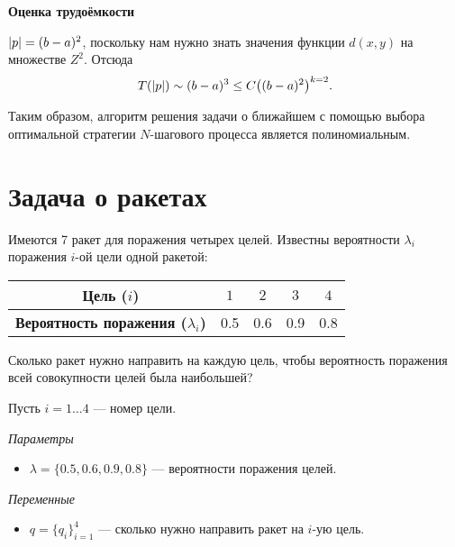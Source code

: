 \bigskip

\textbf{Оценка трудоёмкости}

$\abs{p} = (b - a)^2$, поскольку нам нужно знать значения функции $d(x, y)$ на множестве $Z^2$. Отсюда
\[
T(\abs{p}) \sim (b - a)^3 \le C \big((b-a)^2\big)^{k=2}.
\]

Таким образом, алгоритм решения задачи о ближайшем с помощью выбора оптимальной стратегии $N$-шагового процесса является полиномиальным.

\section{Задача о ракетах}

\problem[о ракетах]

Имеются 7 ракет для поражения четырех целей. Известны вероятности $\lambda_i$ поражения $i$-ой цели одной ракетой: 

\begin{table}[H]
	\centering
	\begin{tabular}{| c | c | c | c | c |} 
		\hline
		\textbf{Цель ($i$)}             & $1$ & $2$ & $3$ & $4$ \\\hline
		\textbf{Вероятность поражения ($\lambda_i$)}              &0.5   & 0.6   & 0.9   & 0.8 \\\hline
	\end{tabular}
\end{table}

Сколько ракет нужно направить на каждую цель, чтобы вероятность поражения всей совокупности целей была наибольшей?

\mathmodel

Пусть $i = 1 \dots 4$ --- номер цели.

\bigskip

\textit{Параметры}

\begin{itemize}[nosep]
	\item $\lambda = \{0.5, 0.6, 0.9, 0.8\}$ --- вероятности поражения целей.
\end{itemize}

\bigskip

\textit{Переменные}

\begin{itemize}[nosep]	
	\item $q = \{q_i\}_{i=1}^4$ --- сколько нужно направить ракет на $i$-ую цель.
\end{itemize}

\bigskip

